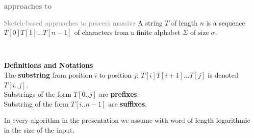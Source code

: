
\begin{frame}
    \vfill
    \bigskip
    \begin{center}
        \large
        \textbf{ \textcolor{gray}{approaches to}   }
    \end{center}
    \vfill
\end{frame}

\def\stringseashells{S,h,e,\_,s,e,l,l,s,\_,s,e,a,s,h,e,l,l,s,\_,b,y,\_,t,h,e,\_,s,e,a,s,h,o,r,e}
\def\stringstruggled{I, ,s,t,r,u,g,g,l,e,d, ,t,o, ,m,a,k,e, ,t,h,i,s, ,f,i,g,u,r,e, ,w,i,t,h, ,t,i,k,z,!}


\begin{frame}{\textcolor{gray}{Sketch-based approaches to process massive }}
    \pause
    A string $T$ of length $n$ is a sequence $T[0]T[1]...T[n-1]$ of characters from a finite alphabet $\Sigma$ of size $\sigma$.\pause \\
    \begin{center}
        \\
    \end{center}
    \pause
    \textbf{Definitions and Notations}\\
    The \textbf{substring} from position $i$ to position $j$: $T[i]T[i+1]...T[j]$ is denoted $T[i..j]$.\\ \pause
    Substrings of the form $T[0..j]$ are \textbf{prefixes}.\\ \pause
    Substring of the form $T[i..n-1]$ are \textbf{suffixes}.\\ \pause

    \medskip
    In every algorithm in the presentation we assume  with word of length logarithmic in the size of the input.
\end{frame}

